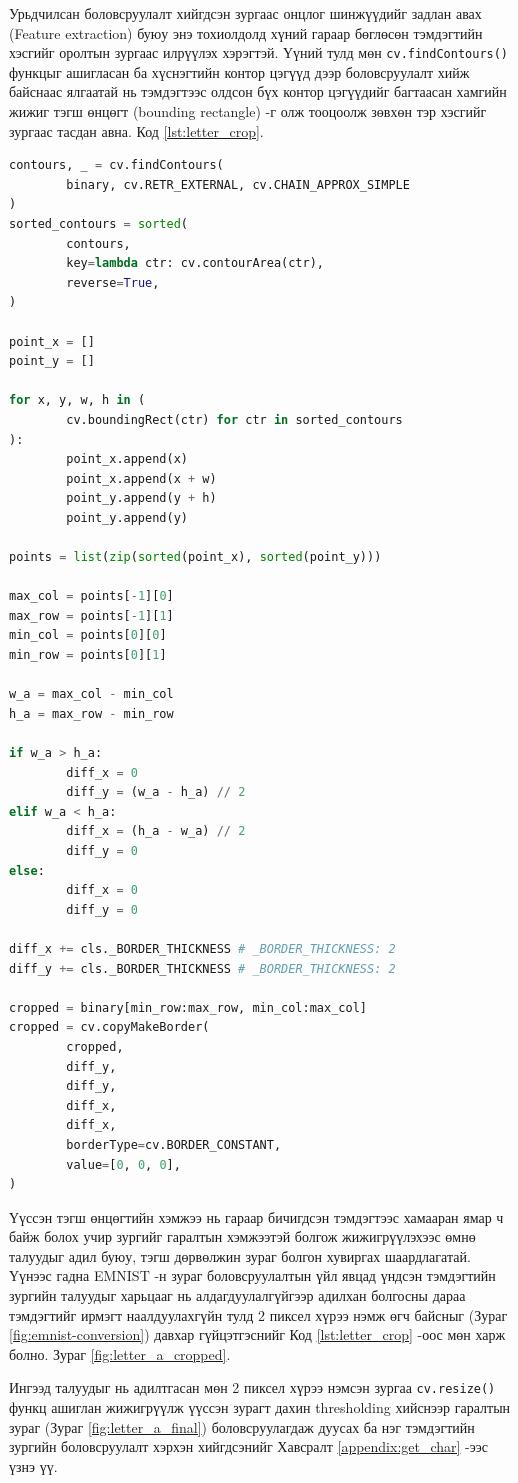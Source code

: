 Урьдчилсан боловсруулалт хийгдсэн зургаас онцлог шинжүүдийг задлан авах (Feature extraction) буюу энэ тохиолдолд хүний гараар бөглөсөн тэмдэгтийн хэсгийг оролтын зургаас илрүүлэх хэрэгтэй. Үүний тулд мөн \texttt{cv.findContours()} функцыг ашигласан ба хүснэгтийн контор цэгүүд дээр боловсруулалт хийж байснаас ялгаатай нь тэмдэгтээс олдсон бүх контор цэгүүдийг багтаасан хамгийн жижиг тэгш өнцөгт (bounding rectangle) -г олж тооцоолж зөвхөн тэр хэсгийг зургаас тасдан авна. Код \ref{lst:letter_crop}.

\begin{lstlisting}[caption={Тэмдэгтээс контор цэгүүдийг олж бүгдийг нь багтаасан хамгийн жижиг тэгш өнцөгтөөр тасдан авах}, label={lst:letter_crop}, language=Python]
contours, _ = cv.findContours(
		binary, cv.RETR_EXTERNAL, cv.CHAIN_APPROX_SIMPLE
)
sorted_contours = sorted(
		contours,
		key=lambda ctr: cv.contourArea(ctr),
		reverse=True,
)

point_x = []
point_y = []

for x, y, w, h in (
		cv.boundingRect(ctr) for ctr in sorted_contours
):
		point_x.append(x)
		point_x.append(x + w)
		point_y.append(y + h)
		point_y.append(y)

points = list(zip(sorted(point_x), sorted(point_y)))

max_col = points[-1][0]
max_row = points[-1][1]
min_col = points[0][0]
min_row = points[0][1]

w_a = max_col - min_col
h_a = max_row - min_row

if w_a > h_a:
		diff_x = 0
		diff_y = (w_a - h_a) // 2
elif w_a < h_a:
		diff_x = (h_a - w_a) // 2
		diff_y = 0
else:
		diff_x = 0
		diff_y = 0

diff_x += cls._BORDER_THICKNESS # _BORDER_THICKNESS: 2
diff_y += cls._BORDER_THICKNESS # _BORDER_THICKNESS: 2

cropped = binary[min_row:max_row, min_col:max_col]
cropped = cv.copyMakeBorder(
		cropped,
		diff_y,
		diff_y,
		diff_x,
		diff_x,
		borderType=cv.BORDER_CONSTANT,
		value=[0, 0, 0],
)
\end{lstlisting}

Үүссэн тэгш өнцөгтийн хэмжээ нь гараар бичигдсэн тэмдэгтээс хамааран ямар ч байж болох учир зургийг гаралтын хэмжээтэй болгож жижигрүүлэхээс өмнө талуудыг адил буюу, тэгш дөрвөлжин зураг болгон хувиргах шаардлагатай. Үүнээс гадна EMNIST -н зураг боловсруулалтын үйл явцад үндсэн тэмдэгтийн зургийн талуудыг харьцааг нь алдагдуулалгүйгээр адилхан болгосны дараа тэмдэгтийг ирмэгт наалдуулахгүйн тулд 2 пиксел хүрээ нэмж өгч байсныг (Зураг \ref{fig:emnist-conversion}) давхар гүйцэтгэснийг Код \ref{lst:letter_crop} -оос мөн харж болно. Зураг \ref{fig:letter_a_cropped}.

Ингээд талуудыг нь адилтгасан мөн 2 пиксел хүрээ нэмсэн зургаа \texttt{cv.resize()} функц ашиглан жижигрүүлж үүссэн зурагт дахин thresholding хийснээр гаралтын зураг (Зураг \ref{fig:letter_a_final}) боловсруулагдаж дуусах ба нэг тэмдэгтийн зургийн боловсруулалт хэрхэн хийгдсэнийг Хавсралт \ref{appendix:get_char} -ээс үзнэ үү.